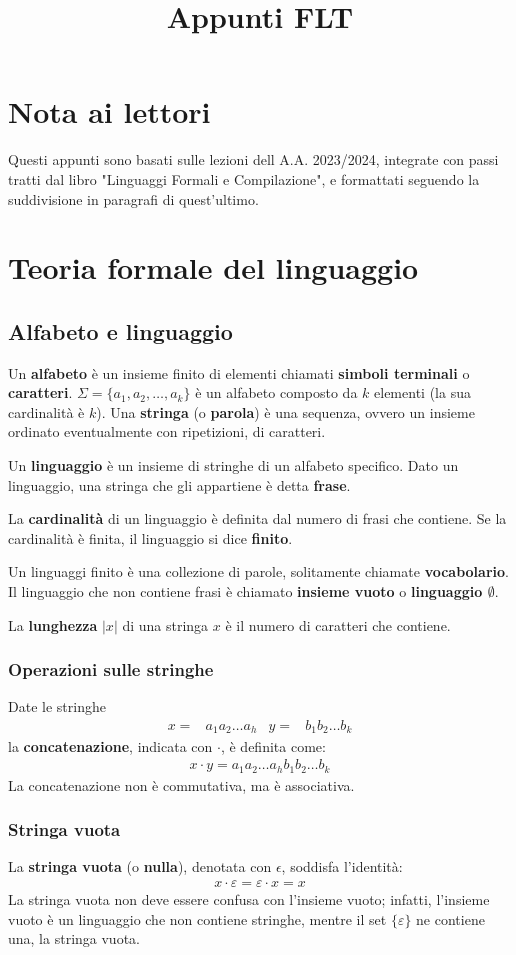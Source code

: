 \documentclass[11pt]{article}
\title{Appunti FLT}
\begin{document}
\section*{Nota ai lettori}
Questi appunti sono basati sulle lezioni dell A.A. 2023/2024, integrate con passi tratti dal libro "Linguaggi Formali e 
Compilazione", e formattati seguendo la suddivisione in paragrafi di quest'ultimo.
\section{Teoria formale del linguaggio}
\subsection{Alfabeto e linguaggio}
Un \textbf{alfabeto} è un insieme finito di elementi chiamati \textbf{simboli terminali} o \textbf{caratteri}.
$\Sigma=\{a_1,a_2,\dots,a_k\}$ è un alfabeto composto da $k$ elementi (la sua cardinalità è $k$). Una \textbf{stringa} (o 
\textbf{parola}) è una sequenza, ovvero un insieme ordinato eventualmente con ripetizioni, di caratteri.

Un \textbf{linguaggio} è un insieme di stringhe di un alfabeto specifico. Dato un linguaggio, una stringa che gli appartiene 
è detta \textbf{frase}. 

La \textbf{cardinalità} di un linguaggio è definita dal numero di frasi che contiene. Se la cardinalità è finita, il linguaggio 
si dice \textbf{finito}. 

Un linguaggi finito è una collezione di parole, solitamente chiamate \textbf{vocabolario}. Il linguaggio che non contiene 
frasi è chiamato \textbf{insieme vuoto} o \textbf{linguaggio $\emptyset$}.

La \textbf{lunghezza} $|x|$ di una stringa $x$ è il numero di caratteri che contiene.
\subsubsection{Operazioni sulle stringhe}
Date le stringhe
\begin{align*}
    x=&a_1a_2\dots a_h   &   y=&b_1b_2\dots b_k
\end{align*}
la \textbf{concatenazione}, indicata con $\cdot$, è definita come:
\begin{align*}
    x\cdot y=a_1a_2\dots a_hb_1b_2\dots b_k
\end{align*}
La concatenazione non è commutativa, ma è associativa.
\subsubsection{Stringa vuota}
La \textbf{stringa vuota} (o \textbf{nulla}), denotata con $\epsilon$, soddisfa l'identità:
\begin{align*}
    x\cdot \varepsilon=\varepsilon \cdot x = x
\end{align*}
La stringa vuota non deve essere confusa con l'insieme vuoto; infatti, l'insieme vuoto è un linguaggio che non contiene 
stringhe, mentre il set $\{\varepsilon\}$ ne contiene una, la stringa vuota.
\end{document}
